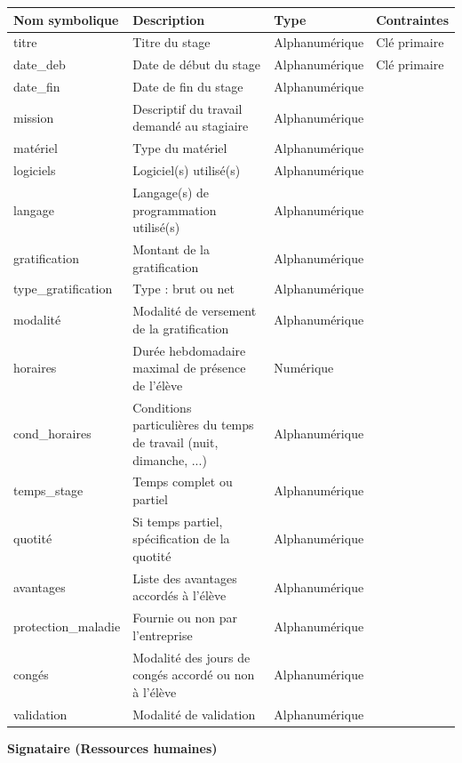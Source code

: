 \documentclass{scrreprt}
\begin{document}
\begin{tabular}{|l|p{6cm}|l|l|}
\hline
\textbf{Nom symbolique} & \textbf{Description} & \textbf{Type} & \textbf{Contraintes} \\
\hline
titre & Titre du stage & Alphanumérique & Clé primaire \\
date\_deb & Date de début du stage & Alphanumérique & Clé primaire \\
date\_fin & Date de fin du stage & Alphanumérique & \\
mission & Descriptif du travail demandé au stagiaire & Alphanumérique & \\
matériel & Type du matériel & Alphanumérique & \\
logiciels & Logiciel(s) utilisé(s) & Alphanumérique & \\
langage & Langage(s) de programmation utilisé(s) & Alphanumérique & \\
gratification & Montant de la gratification & Alphanumérique & \\
type\_gratification & Type : brut ou net & Alphanumérique & \\
modalité & Modalité de versement de la gratification & Alphanumérique & \\
horaires & Durée hebdomadaire maximal de présence de l'élève & Numérique & \\
cond_horaires & Conditions particulières du temps de travail (nuit, dimanche, ...) & Alphanumérique & \\
temps_stage & Temps complet ou partiel & Alphanumérique & \\
quotité & Si temps partiel, spécification de la quotité & Alphanumérique & \\
avantages & Liste des avantages accordés à l’élève & Alphanumérique & \\
protection\_maladie & Fournie ou non par l'entreprise & Alphanumérique & \\
congés & Modalité des jours de congés accordé ou non à l'élève & Alphanumérique &\\
validation & Modalité de validation & Alphanumérique & \\
\hline
\end{tabular}

\begin{flushleft}
\textbf{Signataire (Ressources humaines)}
\end{flushleft}
\end{document}
